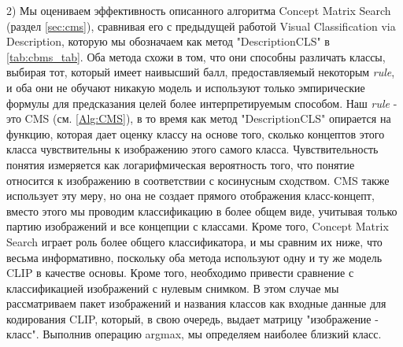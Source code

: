 2) Мы оцениваем эффективность описанного алгоритма Concept Matrix Search (раздел \ref{sec:cms}), сравнивая его с предыдущей работой Visual Classification via Description, которую мы обозначаем как метод "DescriptionCLS" в \cref{tab:cbms_tab}. Оба метода схожи в том, что они способны различать классы, выбирая тот, который имеет наивысший балл, предоставляемый некоторым \textit{rule}, и оба они не обучают никакую модель и используют только эмпирические формулы для предсказания целей более интерпретируемым способом. Наш \textit{rule} - это CMS (см. \cref{Alg:CMS}), в то время как метод "DescriptionCLS" опирается на функцию, которая дает оценку классу на основе того, сколько концептов этого класса чувствительны к изображению этого самого класса. Чувствительность понятия измеряется как логарифмическая вероятность того, что понятие относится к изображению в соответствии с косинусным сходством. CMS также использует эту меру, но она не создает прямого отображения класс-концепт, вместо этого мы проводим классификацию в более общем виде, учитывая только партию изображений и все концепции с классами. Кроме того, Concept Matrix Search играет роль более общего классификатора, и мы сравним их ниже, что весьма информативно, поскольку оба метода используют одну и ту же модель CLIP в качестве основы. Кроме того, необходимо привести сравнение с классификацией изображений с нулевым снимком. В этом случае мы рассматриваем пакет изображений и названия классов как входные данные для кодирования CLIP, который, в свою очередь, выдает матрицу "изображение - класс". Выполнив операцию argmax, мы определяем наиболее близкий класс.

